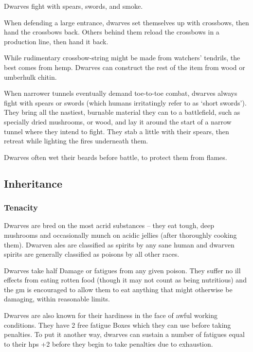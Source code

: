 \begin{multicols}{2}
Dwarves fight with spears, swords, and smoke.

When defending a large entrance, dwarves set themselves up with crossbows, then hand the crossbows back.
Others behind them reload the crossbows in a production line, then hand it back.

While rudimentary crossbow-string might be made from watchers' tendrils,%
the best comes from hemp.
Dwarves can construct the rest of the item from wood or umberhulk chitin.

When narrower tunnels eventually demand toe-to-toe combat, dwarves always fight with spears or swords (which humans irritatingly refer to as `short swords').
They bring all the nastiest, burnable material they can to a battlefield, such as specially dried mushrooms, or wood, and lay it around the start of a narrow tunnel where they intend to fight.
They stab a little with their spears, then retreat while lighting the fires underneath them.

Dwarves often wet their beards before battle, to protect them from flames.

\subsection{Inheritance}

\subsubsection{Tenacity}

Dwarves are bred on the most acrid substances -- they eat tough, deep mushrooms and occasionally munch on acidic jellies (after thoroughly cooking them).
Dwarven ales are classified as spirits by any sane human and dwarven spirits are generally classified as poisons by all other races.

Dwarves take half Damage or \glspl{fatigue} from any given poison.
They suffer no ill effects from eating rotten food (though it may not count as being nutritious) and the \gls{gm} is encouraged to allow them to eat anything that might otherwise be damaging, within reasonable limits.

Dwarves are also known for their hardiness in the face of awful working conditions.
They have 2 free \gls{fatigue} Boxes which they can use before taking penalties.
To put it another way, dwarves can sustain a number of \glspl{fatigue} equal to their \glspl{hp} +2 before they begin to take penalties due to exhaustion.


\end{multicols}
